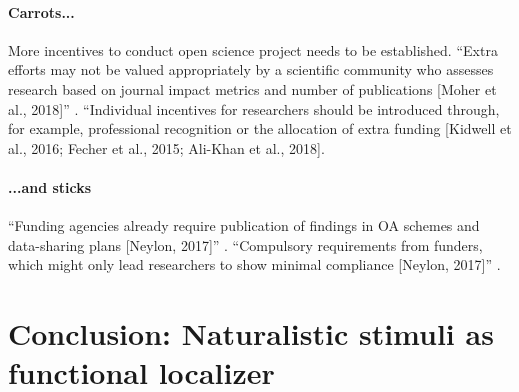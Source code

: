 \paragraph{Carrots...}


%
More incentives to conduct open science project needs to be established.
%
``Extra efforts may not be valued appropriately by a scientific community who
assesses research based on journal impact metrics and number of publications
[Moher et al., 2018]'' \citep{toribio2021early}.
%
``Individual incentives for researchers should be introduced through, for
example, professional recognition or the allocation of extra funding [Kidwell et
al., 2016; Fecher et al., 2015; Ali-Khan et al., 2018].


\paragraph{...and sticks}

%
``Funding agencies already require publication of findings in OA
schemes and data-sharing plans [Neylon, 2017]'' \citep{toribio2021early}.
%
``Compulsory requirements from funders, which might only lead researchers to
show minimal compliance [Neylon, 2017]'' \citep{toribio2021early}.


\section{Conclusion: Naturalistic stimuli as functional localizer}



